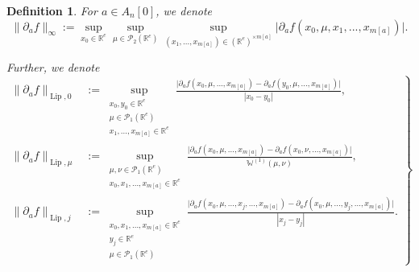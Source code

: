\documentclass[a4paper,11pt,twoside]{article}
\numberwithin{equation}{section}
\theoremstyle{plain}
\newtheorem{definition}[theorem]{Definition}
\newcommand{\bR}{\mathbb{R}}
\newcommand{\bW}{\mathbb{W}}
\newcommand{\cP}{\mathcal{P}}
\DeclareMathOperator{\lip}{Lip}
\newcommand{\A}[1]{A_{#1}[0]}
\newcommand{\1}{\mathbbm{1}}
\begin{document}
	\begin{definition}
		\label{definition:FunctionNorm}
		For $a\in \A{n}$, we denote
		\begin{equation}
			\label{eq:definition:FunctionNorm1}
			\| \partial_a f\|_\infty:= \sup_{x_0 \in \bR^e} \sup_{\mu \in \cP_2(\bR^e)}  \sup_{(x_1, ..., x_{m[a]}) \in (\bR^e)^{\times m[a]}} \big| \partial_a f(x_0, \mu, x_1, ..., x_{m[a]}) \big|. 
		\end{equation}
		
		Further, we denote
		\begin{equation}
			\label{eq:definition:FunctionNorm2}
			\left.\begin{aligned}
				\big\| \partial_a f \big\|_{\lip, 0}
				&:=
				\sup_{\substack{x_0, y_0\in \bR^e \\ \mu \in \cP_1(\bR^e) \\ x_1, ..., x_{m[a]} \in \bR^e}} \frac{\big| \partial_a f(x_0, \mu, ..., x_{m[a]}) - \partial_af(y_0, \mu, ..., x_{m[a]}) \big|}{|x_0 - y_0|}, 
				\\
				\big\| \partial_a f \big\|_{\lip, \mu}
				&:=
				\sup_{\substack{ \mu, \nu\in \cP_1(\bR^e) \\ x_0, x_1, ..., x_{m[a]} \in \bR^e}} \frac{\big| \partial_a f(x_0, \mu, ..., x_{m[a]}) - \partial_af(x_0, \nu, ..., x_{m[a]}) \big|}{\bW^{(1)}(\mu, \nu)}, 
				\\
				\big\| \partial_a f \big\|_{\lip, j}
				&:= 
				\sup_{\substack{x_0,x_1, ..., x_{m[a]} \in \bR^e \\ y_j \in \bR^e \\ \mu \in \cP_1(\bR^e)}} \frac{\big| \partial_a f(x_0, \mu, ..., x_j, ..., x_{m[a]}) - \partial_af(x_0, \mu, ..., y_j, ..., x_{m[a]}) \big|}{|x_j - y_j|}. 
			\end{aligned}\right\rbrace
		\end{equation}
		

\end{definition}
\end{document}
